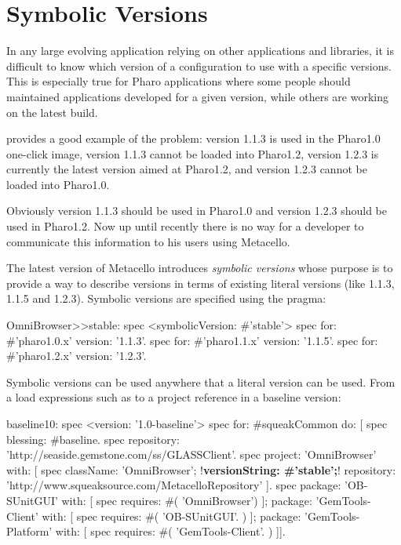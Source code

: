 \documentclass[a4paper,10pt,twoside]{book}
\begin{document}
\section{Symbolic Versions}
In any large evolving application relying on other applications and libraries, it is difficult to know which version of a configuration to use with a specific versions. This is especially true for Pharo applications where some people should maintained applications developed for a given version, while others are working on the latest build.

 provides a good example of the problem: 
version 1.1.3 is used in the Pharo1.0 one-click image,  version 1.1.3 cannot be loaded into Pharo1.2,  version 1.2.3 is currently the latest  version aimed at Pharo1.2, and version 1.2.3 cannot be loaded into Pharo1.0. 

Obviously version 1.1.3 should be used in Pharo1.0 and version 1.2.3 should be used in Pharo1.2. Now up until recently there is no way for a developer to communicate this information to his users using Metacello.

The latest version of Metacello introduces \emph{symbolic versions} whose purpose is to provide a way to describe versions in terms of existing literal versions (like 1.1.3, 1.1.5 and 1.2.3). Symbolic versions are specified using the  pragma:

\begin{code}{}
OmniBrowser>>stable: spec
    <symbolicVersion: #'stable'>
    spec for: #'pharo1.0.x' version: '1.1.3'.
    spec for: #'pharo1.1.x' version: '1.1.5'.
    spec for: #'pharo1.2.x' version: '1.2.3'.
\end{code}

Symbolic versions can be used anywhere that a literal version can be used. From a load expressions such as 
to a project reference in a baseline version:

\begin{code}{}
baseline10: spec
  <version: '1.0-baseline'>
  spec for: #squeakCommon do: [
    spec blessing: #baseline.
    spec repository: 'http://seaside.gemstone.com/ss/GLASSClient'.
    spec
      project: 'OmniBrowser' with: [
        spec
          className: 'OmniBrowser';
          !\textbf{versionString: \#'stable';}!
          repository: 'http://www.squeaksource.com/MetacelloRepository' ].
    spec
       package: 'OB-SUnitGUI' with: [
         spec requires: #( 'OmniBrowser') ];
       package: 'GemTools-Client' with: [
         spec requires: #( 'OB-SUnitGUI'. ) ];
       package: 'GemTools-Platform' with: [
         spec requires: #( 'GemTools-Client'. ) ]].
\end{code}
      
\end{document}

